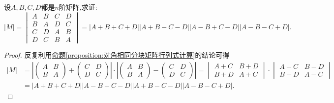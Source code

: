 \documentclass[../../main.tex]{subfiles}%
\begin{document}
\begin{example}
设\(A,B,C,D\)都是\(n\)阶矩阵,求证:
\[
|M| = 
\begin{vmatrix}
A & B & C & D\\
B & A & D & C\\
C & D & A & B\\
D & C & B & A
\end{vmatrix}
= |A + B + C + D||A + B - C - D||A - B + C - D||A - B - C + D|.
\]
\end{example}
\begin{proof}
反复利用\hyperref[proposition:对角相同分块矩阵行列式计算]{命题\ref{proposition:对角相同分块矩阵行列式计算}}的结论可得
\begin{align*}
|M|&=\left|\begin{pmatrix}
A & B\\
B & A
\end{pmatrix}+\begin{pmatrix}
C & D\\
D & C
\end{pmatrix}\right|\cdot\left|\begin{pmatrix}
A & B\\
B & A
\end{pmatrix}-\begin{pmatrix}
C & D\\
D & C
\end{pmatrix}\right|
=\begin{vmatrix}
A + C & B + D\\
B + D & A + C
\end{vmatrix}\cdot\begin{vmatrix}
A - C & B - D\\
B - D & A - C
\end{vmatrix}\\
&=|A + B + C + D||A - B + C - D||A + B - C - D||A - B - C + D|.
\end{align*}
\end{proof}
\end{document}
